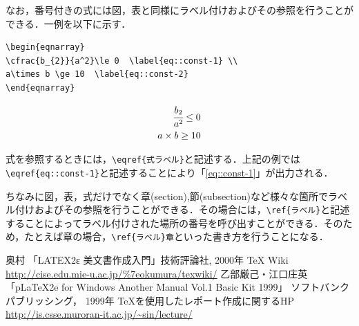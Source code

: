\documentclass[a4j,titlepage]{jarticle}
\begin{document}
なお，番号付きの式には図，表と同様にラベル付けおよびその参照を行うことができる．一例を以下に示す．

\begin{screen}
\begin{verbatim}
\begin{eqnarray} 
\cfrac{b_{2}}{a^2}\le 0  \label{eq::const-1} \\
a\times b \ge 10  \label{eq::const-2} 
\end{eqnarray}
\end{verbatim}
\end{screen}


\begin{eqnarray} 
\cfrac{b_{2}}{a^2}\le 0  \label{eq::const-1} \\
a\times b \ge 10  \label{eq::const-2} 
\end{eqnarray}

式を参照するときには，\verb|\eqref{式ラベル}|と記述する．上記の例では\verb|\eqref{eq::const-1}|と記述することにより「\eqref{eq::const-1}」が出力される．

ちなみに図，表，式だけでなく章(section),節(subsection)など様々な箇所でラベル付けおよびその参照を行うことができる．その場合には，\verb|\ref{ラベル}|と記述することによってラベル付けされた場所の番号を呼び出すことができる．そのため，たとえば章の場合，\verb|\ref{ラベル}章|といった書き方を行うことになる．

\begin{thebibliography}{9}
\small{
 奥村 「LATEX2ε 美文書作成入門」技術評論社, 2000年
 TeX Wiki \newblock \url{http://cise.edu.mie-u.ac.jp/%7eokumura/texwiki/}
 乙部厳己・江口庄英 「pLaTeX2e for Windows Another Manual Vol.1 Basic Kit 1999」 ソフトバンクパブリッシング， 1999年
  TeXを使用したレポート作成に関するHP \newblock \url{http://is.csse.muroran-it.ac.jp/~sin/lecture/}
}
\end{thebibliography}
\end{document}
